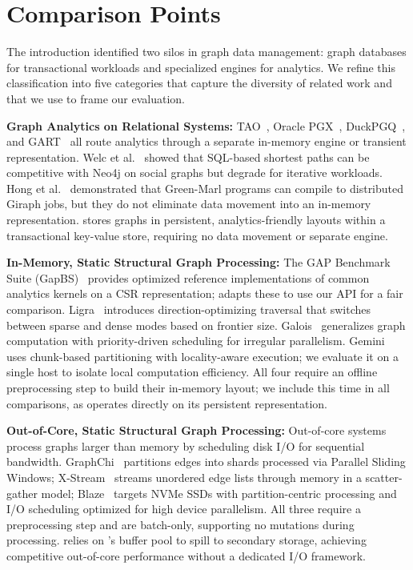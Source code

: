 \section{Comparison Points}
\label{sec:related-work}
The introduction identified two silos in graph data management: graph databases for transactional workloads and specialized engines for analytics. We refine this classification into five categories that capture the diversity of related work and that we use to frame our evaluation.

\textbf{Graph Analytics on Relational Systems:}
TAO~\cite{bronson2013tao}, Oracle PGX~\cite{hong2015pgx,OraclePG,WhatIsOracleSpatialGraph:online}, DuckPGQ~\cite{duckpgq:online}, and GART~\cite{shen2023bridging} all route analytics through a separate in-memory engine or transient representation.
Welc et al.~\cite{welc2013graph,graphProcessingRDBMS} showed that SQL-based shortest paths can be competitive with Neo4j on social graphs but degrade for iterative workloads.
Hong et al.~\cite{hong2013early} demonstrated that Green-Marl programs can compile to distributed Giraph jobs, but they do not eliminate data movement into an in-memory representation.
\project{} stores graphs in persistent, analytics-friendly layouts within a transactional key-value store, requiring no data movement or separate engine.

\textbf{In-Memory, Static Structural Graph Processing:}
The GAP Benchmark Suite (GapBS)~\cite{beamer2015gap} provides optimized reference implementations of common analytics kernels on a CSR representation; \project{} adapts these to use our API for a fair comparison.
Ligra~\cite{shun2013ligra} introduces direction-optimizing traversal that switches between sparse and dense modes based on frontier size.
Galois~\cite{nguyen2013lightweight} generalizes graph computation with priority-driven scheduling for irregular parallelism.
Gemini~\cite{zhu2016gemini} uses chunk-based partitioning with locality-aware execution; we evaluate it on a single host to isolate local computation efficiency.
All four require an offline preprocessing step to build their in-memory layout; we include this time in all comparisons, as \project{} operates directly on its persistent representation.

\textbf{Out-of-Core, Static Structural Graph Processing:}
Out-of-core systems process graphs larger than memory by scheduling disk I/O for sequential bandwidth.
GraphChi~\cite{kyrola2012graphchi} partitions edges into shards processed via Parallel Sliding Windows;
X-Stream~\cite{roy2013x} streams unordered edge lists through memory in a scatter-gather model;
Blaze~\cite{kim2022blaze} targets NVMe SSDs with partition-centric processing and I/O scheduling optimized for high device parallelism.
All three require a preprocessing step and are batch-only, supporting no mutations during processing.
\project{} relies on \wt{}'s buffer pool to spill to secondary storage, achieving competitive out-of-core performance without a dedicated I/O framework.

